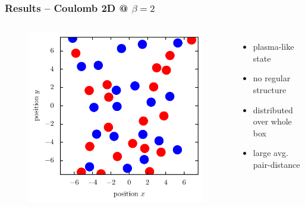\documentclass[mathserif,serif]{beamer}
\begin{document}
\begin{frame}
	\frametitle{Results -- Coulomb 2D @ $\beta=2$}
	\centering
	\begin{columns}	
	\begin{figure}
	\includegraphics[width=\textwidth]{../report/figures/Plasma_1_beta_2.pdf}
	\end{figure}
	\begin{itemize}
	\setlength{\itemsep}{1.3em}
	\item plasma-like state
	\item no regular structure
	\item distributed over whole box
	\item large avg. pair-distance
	\end{itemize}
\end{columns}
\end{frame}
\end{document}
